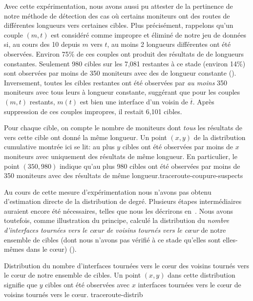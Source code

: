 Avec cette expérimentation, nous avons aussi pu attester de la pertinence de
notre méthode de détection des cas où certains moniteurs ont des routes de
différentes longueurs vers certaines cibles. Plus précisément, rappelons qu'un
couple $(m, t)$ est considéré comme impropre et éliminé de notre jeu de données
si, au cours des 10 \traceroute depuis $m$ vers $t$, au moins 2 longueurs
différentes ont été observées. Environ 75\% de ces couples ont produit des
résultats de \traceroute de longueurs constantes. Seulement 980 cibles sur les
7,081 restantes à ce stade (environ 14\%) sont observées par moins de 350
moniteurs avec des \traceroute de longueur constante
(). Inversement, toutes les cibles restantes
ont été observées par {\em au moins} 350 moniteurs avec tous leurs \traceroute à
longueur constante, suggérant que pour les couples $(m, t)$ restants, $m(t)$ est
bien une interface d'un voisin de $\overline{t}$. Après suppression de ces
couples impropres, il restait 6,101 cibles.

 {Pour chaque cible, on compte le nombre de moniteurs dont
{\em tous} les résultats de \traceroute vers cette cible ont donné la même
longueur. Un point $(x, y)$ de la distribution cumulative montrée ici se lit: au
plus $y$ cibles ont été observées par moins de $x$ moniteurs avec uniquement des
résultats de même longueur. En particulier, le point $(350, 980)$ indique qu'au
plus 980 cibles ont été observées par moins de 350 moniteurs avec des résultats
de même longueur.}{traceroute-coupure-suspects}

Au cours de cette mesure d'expérimentation nous n'avons pas obtenu d'estimation
directe de la distribution de degré. Plusieurs étapes intermédiaires auraient
encore été nécessaires, telles que nous les décrirons
en~. Nous avons toutefois, comme illustration du
principe, calculé la distribution du {\em nombre d'interfaces tournées vers le
cœur de voisins tournés vers le c\oe{}ur} de notre ensemble de cibles (dont nous
n'avons pas vérifié à ce stade qu'elles sont elles-mêmes dans le c\oe{}ur)
({}).

 {Distribution du nombre
d'interfaces tournées vers le c\oe{}ur des voisins tournés vers le c\oe{}ur de notre
ensemble de cibles. Un point $(x, y)$ dans cette distribution signifie que $y$
cibles ont été observées avec $x$ interfaces tournées vers le c\oe{}ur de voisins
tournés vers le c\oe{}ur.} {traceroute-distrib}

